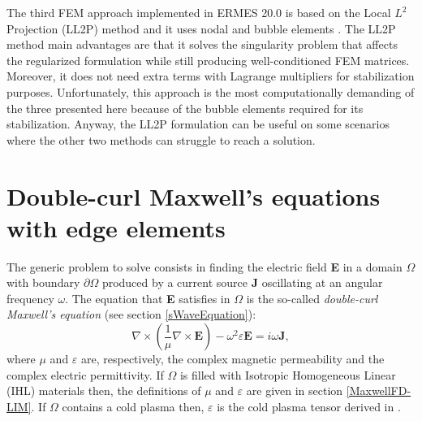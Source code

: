The third FEM approach implemented in ERMES 20.0 is based on the Local $L^{2}$ Projection (LL2P) method and it uses nodal and bubble elements \cite{L2P-BE, L2P-BE-P}. The LL2P method main advantages are that it solves the singularity problem that affects the regularized formulation while still producing well-conditioned FEM matrices. Moreover, it does not need extra terms with Lagrange multipliers for stabilization purposes. Unfortunately, this approach is the most computationally demanding of the three presented here because of the bubble elements required for its stabilization. Anyway, the LL2P formulation can be useful on some scenarios where the other two methods can struggle to reach a solution. 

\section{Double-curl Maxwell's equations with edge elements}\label{DoubleCurlEdge}

The generic problem to solve consists in finding the electric field \textbf{E} in a domain $\Omega$ with boundary $\partial\Omega$ produced by a current source \textbf{J} oscillating at an angular frequency $\omega$. The equation that \textbf{E} satisfies in $\Omega$ is the so-called \emph{double-curl Maxwell's equation} (see section \ref{sWaveEquation}):
\begin{equation}\label{CurlCurlME}
	\nabla\times\left(\frac{1}{\mu}\nabla\times\mathbf{E}\right) - \omega^{2}\varepsilon\mathbf{E} = i\omega\mathbf{J},
\end{equation}
where $\mu$ and $\varepsilon$ are, respectively, the complex magnetic permeability and the complex electric permittivity. If $\Omega$ is filled with Isotropic Homogeneous Linear (IHL) materials then, the definitions of $\mu$ and $\varepsilon$ are given in section \ref{MaxwellFD-LIM}. If $\Omega$ contains a cold plasma then, $\varepsilon$ is the cold plasma tensor derived in \cite{Swanson, Stix}. 


